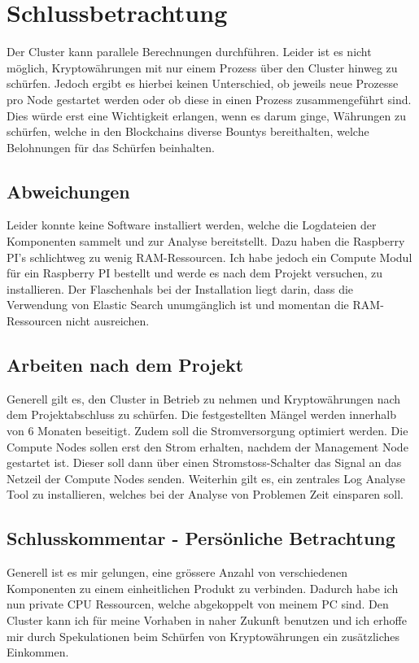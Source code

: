 
\section{Schlussbetrachtung} 
\label{sec:Schlussbetrachtung}
Der Cluster kann parallele Berechnungen durchführen. Leider ist es nicht möglich, Kryptowährungen mit nur einem Prozess über den Cluster hinweg zu schürfen. Jedoch ergibt es hierbei keinen Unterschied, ob jeweils neue Prozesse pro Node gestartet werden oder ob diese in einen Prozess zusammengeführt sind. Dies würde erst eine Wichtigkeit erlangen, wenn es darum ginge, Währungen zu schürfen, welche in den Blockchains diverse Bountys bereithalten, welche Belohnungen für das Schürfen beinhalten.

\subsection{Abweichungen}
Leider konnte keine Software installiert werden, welche die Logdateien der Komponenten sammelt und zur Analyse bereitstellt. Dazu haben die Raspberry PI's schlichtweg zu wenig RAM-Ressourcen. Ich habe jedoch ein Compute Modul für ein Raspberry PI bestellt und werde es nach dem Projekt versuchen, zu installieren. Der Flaschenhals bei der Installation liegt darin, dass die Verwendung von Elastic Search unumgänglich ist und momentan die RAM-Ressourcen nicht ausreichen.

\subsection{Arbeiten nach dem Projekt}
Generell gilt es, den Cluster in Betrieb zu nehmen und Kryptowährungen nach dem Projektabschluss zu schürfen. Die festgestellten Mängel werden innerhalb von 6 Monaten beseitigt. Zudem soll die Stromversorgung optimiert werden. Die Compute Nodes sollen erst den Strom erhalten, nachdem der Management Node gestartet ist. Dieser soll dann über einen Stromstoss-Schalter das Signal an das Netzeil der Compute Nodes senden. Weiterhin gilt es, ein zentrales Log Analyse Tool zu installieren, welches bei der Analyse von Problemen Zeit einsparen soll.

\subsection{Schlusskommentar - Persönliche Betrachtung}
Generell ist es mir gelungen, eine grössere Anzahl von verschiedenen Komponenten zu einem einheitlichen Produkt zu verbinden. Dadurch habe ich nun private CPU Ressourcen, welche abgekoppelt von meinem PC sind. Den Cluster kann ich für meine Vorhaben in naher Zukunft benutzen und ich erhoffe mir durch Spekulationen beim Schürfen von Kryptowährungen ein zusätzliches Einkommen.

